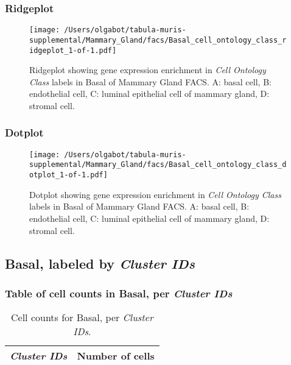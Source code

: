 \clearpage

\subsubsection{Ridgeplot}
\begin{figure}[h]
\centering
\texttt{[image: /Users/olgabot/tabula-muris-supplemental/Mammary\_Gland/facs/Basal\_cell\_ontology\_class\_ridgeplot\_1-of-1.pdf]}

\caption{ Ridgeplot  showing gene expression enrichment in \emph{Cell Ontology Class} labels in Basal of Mammary Gland FACS. A: basal cell, B: endothelial cell, C: luminal epithelial cell of mammary gland, D: stromal cell.}
\end{figure}


\clearpage

\subsubsection{Dotplot}
\begin{figure}[h]
\centering
\texttt{[image: /Users/olgabot/tabula-muris-supplemental/Mammary\_Gland/facs/Basal\_cell\_ontology\_class\_dotplot\_1-of-1.pdf]}

\caption{ Dotplot  showing gene expression enrichment in \emph{Cell Ontology Class} labels in Basal of Mammary Gland FACS. A: basal cell, B: endothelial cell, C: luminal epithelial cell of mammary gland, D: stromal cell.}
\end{figure}


\clearpage

\subsection{Basal, labeled by \emph{Cluster IDs}}
\subsubsection{Table of cell counts in Basal, per \emph{Cluster IDs}}\begin{table}[h]
\centering
\label{my-label}
\begin{tabular}{@{}ll@{}}
\toprule

\emph{Cluster IDs}& Number of cells \\ \midrule\bottomrule
\end{tabular}
\caption{Cell counts for Basal, per \emph{Cluster IDs}.}
\end{table}

